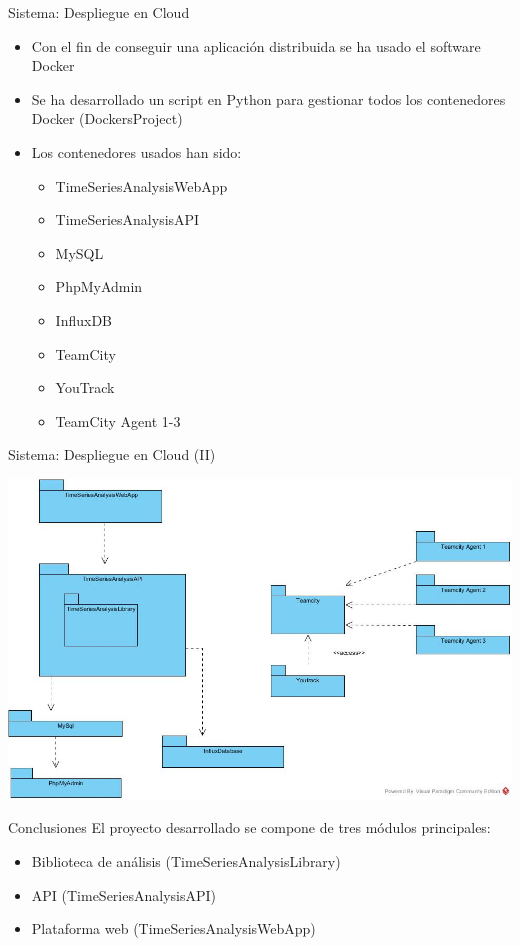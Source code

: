 \begin{tframe}{Sistema: Despliegue en Cloud}
	\begin{itemize}
		\item<+-| alert@+> Con el fin de conseguir una aplicación distribuida se ha usado el software Docker
		\item<+-| alert@+> Se ha desarrollado un script en Python para gestionar todos los contenedores Docker (DockersProject)
		\item<+-> Los contenedores usados han sido:
		\begin{itemize}
			\item TimeSeriesAnalysisWebApp
			\item TimeSeriesAnalysisAPI
			\item MySQL
			\item PhpMyAdmin
			\item InfluxDB
			\item TeamCity
			\item YouTrack
			\item TeamCity Agent 1-3
		\end{itemize}
	\end{itemize}
\end{tframe}

\begin{tframe}{Sistema: Despliegue en Cloud (II)}
	\begin{center}
		\includegraphics[scale=0.28]{images/DockerContainers}
	\end{center}
\end{tframe}

\begin{tframe}{Conclusiones}
	El proyecto desarrollado se compone de tres módulos principales:
	\begin{itemize}
		\item<+-| alert@+> Biblioteca de análisis (TimeSeriesAnalysisLibrary)
		\item<+-| alert@+> API (TimeSeriesAnalysisAPI)
		\item<+-| alert@+> Plataforma web (TimeSeriesAnalysisWebApp)
	\end{itemize}		
\end{tframe}

